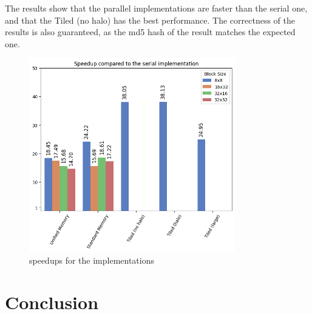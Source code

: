 \documentclass{article}
\begin{document}
The results show that the parallel implementations are faster than the serial one, and that the Tiled (no halo) has the best performance. The correctness of the results is also guaranteed, as the md5 hash of the result matches the expected one.

\begin{figure}[htp]
    \centering
    \includegraphics[width=0.8\textwidth]{../image-2.png}
    \caption{speedups for the implementations}
    \label{fig:speedups}
\end{figure}

\section{Conclusion}
\lipsum[9]
\end{document}
